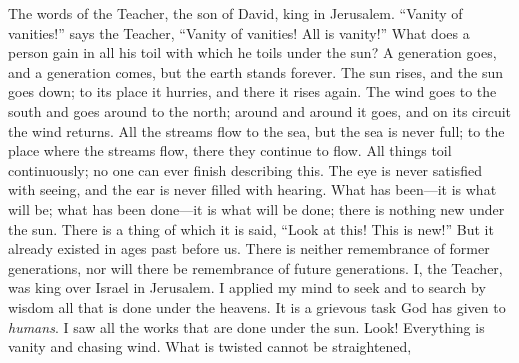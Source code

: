 
\begin{biblechapter} %
 The words of the Teacher, the son of David, king in Jerusalem.
 “Vanity of vanities!” says the Teacher, 
“Vanity of vanities! All is vanity!”
 What does a person gain in all his toil 
with which he toils under the sun?
\verse A generation goes, and a generation comes, 
but the earth stands forever.
\verse The sun rises, and the sun goes down; 
to its place it hurries, and there it rises again.
\verse The wind goes to the south and goes around to the north; 
around and around it goes, and on its circuit the wind returns.
\verse All the streams flow to the sea, 
but the sea is never full; 
to the place where the streams flow, 
there they continue to flow.
\verse All things toil continuously; 
no one can ever finish describing this. 
The eye is never satisfied with seeing, 
and the ear is never filled with hearing.
\verse What has been—it is what will be; 
what has been done—it is what will be done; 
there is nothing new under the sun.
\verse There is a thing of which it is said, “Look at this! This is new!” 
But it already existed in ages past before us.
\verse There is neither remembrance of former generations, 
nor will there be remembrance of future generations.
 I, the Teacher, was king over Israel in Jerusalem.
\verse I applied my mind to seek and to search by wisdom all that is done under the heavens. It is a grievous task God has given to \textit{humans}.
\verse I saw all the works that are done under the sun. Look! Everything is vanity and chasing wind.
\verse What is twisted cannot be straightened, 

\end{biblechapter}
